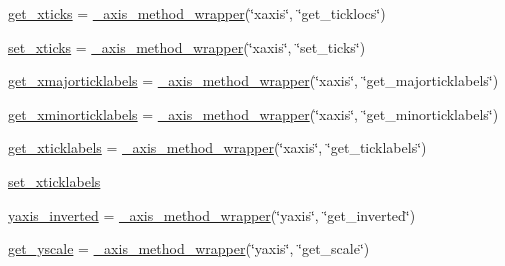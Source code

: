 \begin{DoxyCompactItemize}
\item 
\hyperlink{classmatplotlib_1_1axes_1_1__base_1_1__AxesBase_a40d863b568532a41a160927d4e5306d4}{get\+\_\+xticks} = \hyperlink{classmatplotlib_1_1axes_1_1__base_1_1__axis__method__wrapper}{\+\_\+axis\+\_\+method\+\_\+wrapper}(\char`\"{}xaxis\char`\"{}, \char`\"{}get\+\_\+ticklocs\char`\"{})
\item 
\hyperlink{classmatplotlib_1_1axes_1_1__base_1_1__AxesBase_a0ffd48bac0bc64b833b2600e01b7509c}{set\+\_\+xticks} = \hyperlink{classmatplotlib_1_1axes_1_1__base_1_1__axis__method__wrapper}{\+\_\+axis\+\_\+method\+\_\+wrapper}(\char`\"{}xaxis\char`\"{}, \char`\"{}set\+\_\+ticks\char`\"{})
\item 
\hyperlink{classmatplotlib_1_1axes_1_1__base_1_1__AxesBase_a2db9594f149490ce6dffdd2aa7c9e145}{get\+\_\+xmajorticklabels} = \hyperlink{classmatplotlib_1_1axes_1_1__base_1_1__axis__method__wrapper}{\+\_\+axis\+\_\+method\+\_\+wrapper}(\char`\"{}xaxis\char`\"{}, \char`\"{}get\+\_\+majorticklabels\char`\"{})
\item 
\hyperlink{classmatplotlib_1_1axes_1_1__base_1_1__AxesBase_acc72c3c35329fbd73a31bc1ba700674e}{get\+\_\+xminorticklabels} = \hyperlink{classmatplotlib_1_1axes_1_1__base_1_1__axis__method__wrapper}{\+\_\+axis\+\_\+method\+\_\+wrapper}(\char`\"{}xaxis\char`\"{}, \char`\"{}get\+\_\+minorticklabels\char`\"{})
\item 
\hyperlink{classmatplotlib_1_1axes_1_1__base_1_1__AxesBase_a6b1803dd3926298d504a86107595af15}{get\+\_\+xticklabels} = \hyperlink{classmatplotlib_1_1axes_1_1__base_1_1__axis__method__wrapper}{\+\_\+axis\+\_\+method\+\_\+wrapper}(\char`\"{}xaxis\char`\"{}, \char`\"{}get\+\_\+ticklabels\char`\"{})
\item 
\hyperlink{classmatplotlib_1_1axes_1_1__base_1_1__AxesBase_a592986929153cb2d881bc14554c89342}{set\+\_\+xticklabels}
\item 
\hyperlink{classmatplotlib_1_1axes_1_1__base_1_1__AxesBase_acbda8c6ae3c0395bc93cd02b1c0c5e33}{yaxis\+\_\+inverted} = \hyperlink{classmatplotlib_1_1axes_1_1__base_1_1__axis__method__wrapper}{\+\_\+axis\+\_\+method\+\_\+wrapper}(\char`\"{}yaxis\char`\"{}, \char`\"{}get\+\_\+inverted\char`\"{})
\item 
\hyperlink{classmatplotlib_1_1axes_1_1__base_1_1__AxesBase_a09769d8e92d081f28cc311b2828e4b0a}{get\+\_\+yscale} = \hyperlink{classmatplotlib_1_1axes_1_1__base_1_1__axis__method__wrapper}{\+\_\+axis\+\_\+method\+\_\+wrapper}(\char`\"{}yaxis\char`\"{}, \char`\"{}get\+\_\+scale\char`\"{})
\item 

\end{DoxyCompactItemize}

